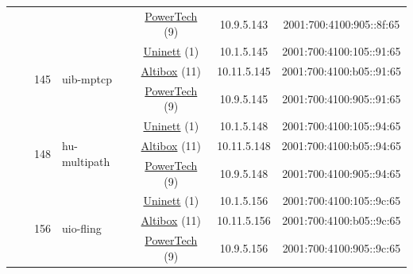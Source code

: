 \begin{small}
\begin{center}
\begin{longtable}{|c|c|c|c|c|c|c|c|}
  &  &  &  & \multicolumn{2}{|c|}{\tiny{\href{http://www.powertech.no}{PowerTech} (9)}} & \tiny{10.9.5.143} & \tiny{2001:700:4100:905::8f:65} \\* \cline{3-3}\cline{4-4}\cline{5-5}\cline{6-6}\cline{7-7}\cline{8-8}
  &  & \multirow{3}{*}{\tiny{145}} & \multicolumn{1}{|l|}{\multirow{3}{*}{\tiny{uib-mptcp}}} & \multicolumn{2}{|c|}{\tiny{\href{https://www.uninett.no}{Uninett} (1)}} & \tiny{10.1.5.145} & \tiny{2001:700:4100:105::91:65} \\* \cline{5-5}\cline{6-6}\cline{7-7}\cline{8-8}
  &  &  &  & \multicolumn{2}{|c|}{\tiny{\href{https://www.altibox.no}{Altibox} (11)}} & \tiny{10.11.5.145} & \tiny{2001:700:4100:b05::91:65} \\* \cline{5-5}\cline{6-6}\cline{7-7}\cline{8-8}
  &  &  &  & \multicolumn{2}{|c|}{\tiny{\href{http://www.powertech.no}{PowerTech} (9)}} & \tiny{10.9.5.145} & \tiny{2001:700:4100:905::91:65} \\* \cline{3-3}\cline{4-4}\cline{5-5}\cline{6-6}\cline{7-7}\cline{8-8}
  &  & \multirow{3}{*}{\tiny{148}} & \multicolumn{1}{|l|}{\multirow{3}{*}{\tiny{hu-multipath}}} & \multicolumn{2}{|c|}{\tiny{\href{https://www.uninett.no}{Uninett} (1)}} & \tiny{10.1.5.148} & \tiny{2001:700:4100:105::94:65} \\* \cline{5-5}\cline{6-6}\cline{7-7}\cline{8-8}
  &  &  &  & \multicolumn{2}{|c|}{\tiny{\href{https://www.altibox.no}{Altibox} (11)}} & \tiny{10.11.5.148} & \tiny{2001:700:4100:b05::94:65} \\* \cline{5-5}\cline{6-6}\cline{7-7}\cline{8-8}
  &  &  &  & \multicolumn{2}{|c|}{\tiny{\href{http://www.powertech.no}{PowerTech} (9)}} & \tiny{10.9.5.148} & \tiny{2001:700:4100:905::94:65} \\* \cline{3-3}\cline{4-4}\cline{5-5}\cline{6-6}\cline{7-7}\cline{8-8}
  &  & \multirow{3}{*}{\tiny{156}} & \multicolumn{1}{|l|}{\multirow{3}{*}{\tiny{uio-fling}}} & \multicolumn{2}{|c|}{\tiny{\href{https://www.uninett.no}{Uninett} (1)}} & \tiny{10.1.5.156} & \tiny{2001:700:4100:105::9c:65} \\* \cline{5-5}\cline{6-6}\cline{7-7}\cline{8-8}
  &  &  &  & \multicolumn{2}{|c|}{\tiny{\href{https://www.altibox.no}{Altibox} (11)}} & \tiny{10.11.5.156} & \tiny{2001:700:4100:b05::9c:65} \\* \cline{5-5}\cline{6-6}\cline{7-7}\cline{8-8}
  &  &  &  & \multicolumn{2}{|c|}{\tiny{\href{http://www.powertech.no}{PowerTech} (9)}} & \tiny{10.9.5.156} & \tiny{2001:700:4100:905::9c:65} \\* \cline{3-3}\cline{4-4}\cline{5-5}\cline{6-6}\cline{7-7}\cline{8-8}

\end{longtable}
\end{center}
\end{small}
